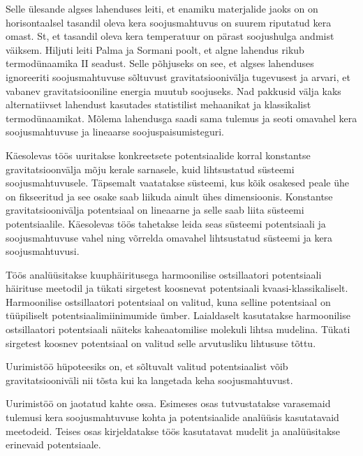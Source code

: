 \documentclass{trkut}%
\begin{document}
Selle ülesande algses lahenduses leiti, et enamiku materjalide jaoks on on horisontaalsel tasandil oleva kera soojusmahtuvus on suurem riputatud kera omast.
St, et tasandil oleva kera temperatuur on pärast soojushulga andmist väiksem.
Hiljuti leiti Palma ja Sormani poolt, et algne lahendus rikub termodünaamika II seadust.
Selle põhjuseks on see, et algses lahenduses ignoreeriti soojusmahtuvuse sõltuvust gravitatsioonivälja tugevusest ja arvari, et vabanev gravitatsiooniline energia muutub soojuseks.
Nad pakkusid välja kaks alternatiivset lahendust kasutades statistilist mehaanikat ja klassikalist termodünaamikat.
Mõlema lahendusga saadi sama tulemus ja seoti omavahel kera soojusmahtuvuse ja lineaarse soojuspaisumisteguri.

Käesolevas töös uuritakse konkreetsete potentsiaalide korral konstantse gravitatsioonvälja mõju kerale sarnasele, kuid lihtsustatud süsteemi soojusmahtuvusele.
Täpsemalt vaatatakse süsteemi, kus kõik osakesed peale ühe on fikseeritud ja see osake saab liikuda ainult ühes dimensioonis.
Konstantse gravitatsioonivälja potentsiaal on lineaarne ja selle saab liita süsteemi potentsiaalile.
Käesolevas töös tahetakse leida seas süsteemi potentsiaali ja soojusmahtuvuse vahel ning võrrelda omavahel lihtsustatud süsteemi ja kera soojusmahtuvusi.

Töös analüüsitakse kuuphäiritusega harmoonilise ostsillaatori potentsiaali häirituse meetodil ja tükati sirgetest koosnevat potentsiaali kvaasi-klassikaliselt.
Harmoonilise ostsillaatori potentsiaal on valitud, kuna selline potentsiaal on tüüpiliselt potentsiaalimiinimumide ümber.
Laialdaselt kasutatakse harmoonilise ostsillaatori potentsiaali näiteks kaheaatomilise molekuli lihtsa mudelina.
Tükati sirgetest koosnev potentsiaal on valitud selle arvutusliku lihtususe tõttu.


Uurimistöö hüpoteesiks on, et sõltuvalt valitud potentsiaalist võib gravitatsiooniväli nii tõsta kui ka langetada keha soojusmahtuvust.

Uurimistöö on jaotatud kahte ossa.
Esimeses osas tutvustatakse varasemaid tulemusi kera soojusmahtuvuse kohta ja potentsiaalide analüüsis kasutatavaid meetodeid.
Teises osas kirjeldatakse töös kasutatavat mudelit ja analüüsitakse erinevaid potentsiaale.
\end{document}

